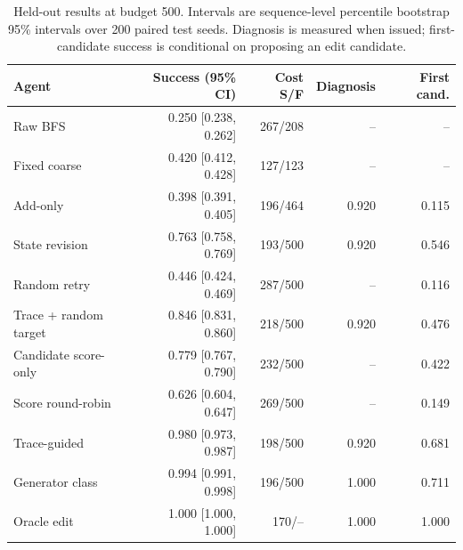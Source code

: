 \begin{table}[t]
\centering
\caption{Held-out results at budget 500. Intervals are sequence-level percentile bootstrap 95\% intervals over 200 paired test seeds. Diagnosis is measured when issued; first-candidate success is conditional on proposing an edit candidate.}
\label{tab:main-results}
\small
\begin{tabular}{lrrrr}
\toprule
Agent & Success (95\% CI) & Cost S/F & Diagnosis & First cand. \\
\midrule
Raw BFS & 0.250 [0.238, 0.262] & 267/208 & -- & -- \\
Fixed coarse & 0.420 [0.412, 0.428] & 127/123 & -- & -- \\
Add-only & 0.398 [0.391, 0.405] & 196/464 & 0.920 & 0.115 \\
State revision & 0.763 [0.758, 0.769] & 193/500 & 0.920 & 0.546 \\
Random retry & 0.446 [0.424, 0.469] & 287/500 & -- & 0.116 \\
Trace + random target & 0.846 [0.831, 0.860] & 218/500 & 0.920 & 0.476 \\
Candidate score-only & 0.779 [0.767, 0.790] & 232/500 & -- & 0.422 \\
Score round-robin & 0.626 [0.604, 0.647] & 269/500 & -- & 0.149 \\
Trace-guided & 0.980 [0.973, 0.987] & 198/500 & 0.920 & 0.681 \\
Generator class & 0.994 [0.991, 0.998] & 196/500 & 1.000 & 0.711 \\
Oracle edit & 1.000 [1.000, 1.000] & 170/-- & 1.000 & 1.000 \\
\bottomrule
\end{tabular}
\end{table}
